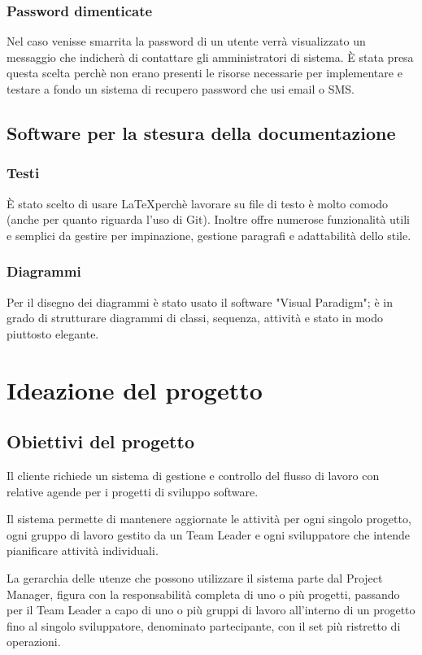 \documentclass[12pt]{scrartcl}
\begin{document}
\subsubsection{Password dimenticate}
    Nel caso venisse smarrita la password di un utente verr\`a visualizzato
    un messaggio che indicher\`a di contattare gli amministratori di 
    sistema. \`E stata presa questa scelta perch\`e non erano presenti
    le risorse necessarie per implementare e testare a fondo un sistema
    di recupero password che usi email o SMS.

\subsection{Software per la stesura della documentazione}
\subsubsection{Testi}
    \`E stato scelto di usare \LaTeX perch\`e lavorare su file di testo \`e molto
    comodo (anche per quanto riguarda l'uso di Git). Inoltre offre numerose
    funzionalit\`a utili e semplici da gestire per impinazione, gestione paragrafi
    e adattabilit\`a dello stile.
\subsubsection{Diagrammi}
    Per il disegno dei diagrammi \`e stato usato il software "Visual Paradigm";
    \`e in grado di strutturare diagrammi di classi, sequenza, attivit\`a e
    stato in modo piuttosto elegante.

\section{Ideazione del progetto}
\subsection{Obiettivi del progetto}
Il cliente richiede un sistema di gestione e controllo del flusso
di lavoro con relative agende per i progetti di sviluppo software.

Il sistema permette di mantenere aggiornate le attivit\`a per ogni
singolo progetto, ogni gruppo di lavoro gestito da un Team Leader
e ogni sviluppatore che intende pianificare attivit\`a individuali.

La gerarchia delle utenze che possono utilizzare il sistema parte
dal Project Manager, figura con la responsabilit\`a completa di uno
o pi\`u progetti, passando per il Team Leader a capo di uno o pi\`u
gruppi di lavoro all'interno di un progetto fino al singolo
sviluppatore, denominato partecipante, con il set pi\`u ristretto
di operazioni.
\end{document}
